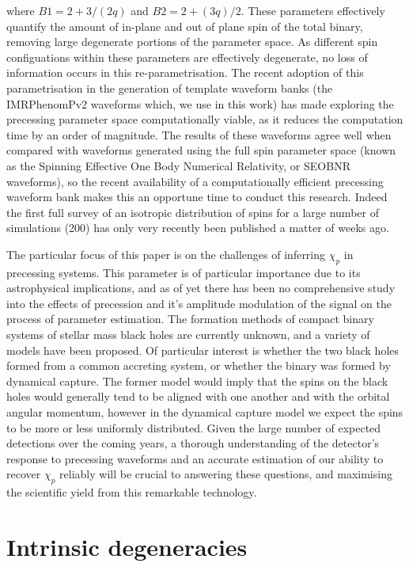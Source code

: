 \documentclass[11pt]{article}
\begin{document}
where $B1=2+3/(2q)$ and $B2=2+(3q)/2$. These parameters effectively quantify the amount of in-plane and out of plane spin of the total binary, removing large degenerate portions of the parameter space. As different spin configuations within these parameters are effectively degenerate, no loss of information occurs in this re-parametrisation. The recent adoption of this parametrisation in the generation of template waveform banks (the IMRPhenomPv2 waveforms which, we use in this work) has made exploring the precessing parameter space computationally viable, as it reduces the computation time by an order of magnitude. The results of these waveforms agree well when compared with waveforms generated using the full spin parameter space (known as the Spinning Effective One Body Numerical Relativity, or SEOBNR waveforms)\cite{spin}\cite{eob}, so the recent availability of a computationally efficient precessing waveform bank makes this an opportune time to conduct this research. Indeed the first full survey of an isotropic distribution of spins for a large number of simulations (200) has only very recently been published a matter of weeks ago\cite{pe_latest}.

The particular focus of this paper is on the challenges of inferring $\chi_p$ in precessing systems. This parameter is of particular importance due to its astrophysical implications, and as of yet there has been no comprehensive study into the effects of precession and it's amplitude modulation of the signal on the process of parameter estimation. The formation methods of compact binary systems of stellar mass black holes are currently unknown, and a variety of models have been proposed\cite{modal}. Of particular interest is whether the two black holes formed from a common accreting system, or whether the binary was formed by dynamical capture. The former model would imply that the spins on the black holes would generally tend to be aligned with one another and with the orbital angular momentum, however in the dynamical capture model we expect the spins to be more or less uniformly distributed. Given the large number of expected detections over the coming years, a thorough understanding of the detector's response to precessing waveforms and an accurate estimation of our ability to recover $\chi_p$ reliably will be crucial to answering these questions, and maximising the scientific yield from this remarkable technology.
\section{Intrinsic degeneracies}
\end{document}
